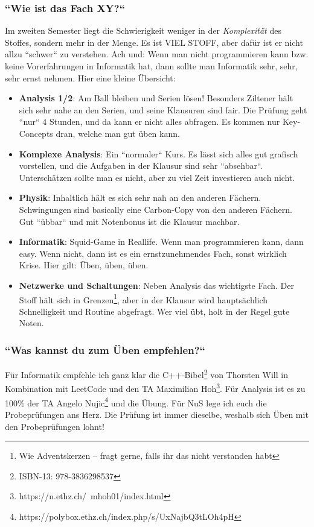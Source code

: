 \documentclass[11pt,a4paper]{article}
\begin{document}
\subsubsection{``Wie ist das Fach XY{?}``}
Im zweiten Semester liegt die Schwierigkeit weniger in der \textit{Komplexität} des Stoffes, sondern mehr in der Menge. Es ist VIEL STOFF, aber dafür ist er nicht allzu ``schwer`` zu verstehen. Ach und: Wenn man nicht programmieren kann bzw. keine Vorerfahrungen in Informatik hat, dann sollte man Informatik sehr, sehr, sehr ernst nehmen. Hier eine kleine Übersicht:

\begin{itemize}
    \item \textbf{Analysis 1/2}: Am Ball bleiben und Serien lösen! Besonders Ziltener hält sich sehr nahe an den Serien, und seine Klausuren sind fair. Die Prüfung geht ``nur`` 4 Stunden, und da kann er nicht alles abfragen. Es kommen nur Key-Concepts dran, welche man gut üben kann.
    \item \textbf{Komplexe Analysis}: Ein ``normaler`` Kurs. Es lässt sich alles gut grafisch vorstellen, und die Aufgaben in der Klausur sind sehr ``absehbar``. Unterschätzen sollte man es nicht, aber zu viel Zeit investieren auch nicht.
    \item \textbf{Physik}: Inhaltlich hält es sich sehr nah an den anderen Fächern. Schwingungen sind basically eine Carbon-Copy von den anderen Fächern. Gut ``übbar`` und mit Notenbonus ist die Klausur machbar.
    \item \textbf{Informatik}: Squid-Game in Reallife. Wenn man programmieren kann, dann easy. Wenn nicht, dann ist es ein ernstzunehmendes Fach, sonst wirklich Krise. Hier gilt: Üben, üben, üben.
    \item \textbf{Netzwerke und Schaltungen}: Neben Analysis das wichtigste Fach. Der Stoff hält sich in Grenzen\footnote{Wie Adventskerzen – fragt gerne, falls ihr das nicht verstanden habt}, aber in der Klausur wird hauptsächlich Schnelligkeit und Routine abgefragt. Wer viel übt, holt in der Regel gute Noten.
\end{itemize}

\subsubsection{``Was kannst du zum Üben empfehlen{?}``}
Für Informatik empfehle ich ganz klar die C++-Bibel\footnote{ISBN-13: 978-3836298537} von Thorsten Will in Kombination mit LeetCode und den TA Maximilian Hoh\footnote{https://n.ethz.ch/~mhoh01/index.html}. Für Analysis ist es zu 100\% der TA Angelo Nujic\footnote{https://polybox.ethz.ch/index.php/s/UxNajbQ3tLOh4pH} und die Übung. Für NuS lege ich euch die Probeprüfungen ans Herz. Die Prüfung ist immer dieselbe, weshalb sich Üben mit den Probeprüfungen lohnt!
\end{document}
